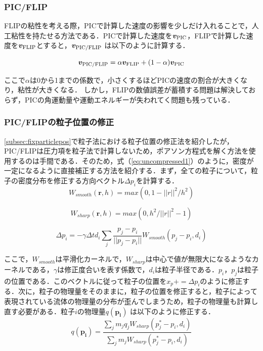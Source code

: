 \documentclass[a4j,12pt]{jreport}
\begin{document}
\subsubsection{PIC/FLIP} \label{subsec:PIC/FLIP}
FLIPの粘性を考える際，PICで計算した速度の影響を少しだけ入れることで，人工粘性を持たせる方法である．PICで計算した速度を$\bm{v}_{\rm{PIC}}$，FLIPで計算した速度を$\bm{v}_{\rm{FLIP}}$とすると，$\bm{v}_{\rm{PIC/FLIP}}$ は以下のように計算する．

\begin{equation}\label{eq:PIC/FLIP}
\bm{v}_{\rm{PIC/FLIP}} =\alpha \bm{v}_{\rm{FLIP}} +(1-\alpha) \bm{v}_{\rm{PIC}}
\end{equation} 

ここで$\alpha$は0から1までの係数で，小さくするほどPICの速度の割合が大きくなり，粘性が大きくなる．
しかし，FLIPの数値誤差が蓄積する問題は解決しておらず，PICの角運動量や運動エネルギーが失われてく問題も残っている．

\subsubsection{PIC/FLIPの粒子位置の修正}\label{subsubsec:fixparticlepos}
\ref{subsec:fixparticlepos}で粒子法における粒子位置の修正法を紹介したが，PIC/FLIPは圧力項を粒子法で計算しないため，ポアソン方程式を解く方法を使用するのは手間である．そのため，式（\ref{eq:uncompressed1}）のように，密度が一定になるように直接補正する方法を紹介する．まず，全ての粒子について，粒子の密度分布を修正する方向ベクトル$\Delta p_i$を計算する．
\begin{equation}\label{eq:w_smooth}
W_{smooth}(\bm{r},h) = max(0,1-||r||^2/h^2)
\end{equation} 

\begin{equation}\label{eq:w_sharp}
W_{sharp}(\bm{r},h) = max(0,h^2/||r||^2 - 1)
\end{equation} 

\begin{equation}\label{eq:fixVector}
\Delta p_i = -\gamma \Delta td_i\sum\limits_j \frac{p_j - p_i}{||p_j - p_i||}W_{smooth}(p_j - p_i,d_i)
\end{equation} 

ここで，$W_{smooth}$は平滑化カーネルで，$W_{sharp}$は中心で値が無限大になるようなカーネルである，$\gamma$は修正度合いを表す係数で，$d_i$は粒子半径である．$p_i$，$p_j$は粒子の位置である．このベクトルに従って粒子の位置を$x_p += \Delta p_i$のように修正する．次に，粒子の物理量をそのままに，粒子の位置を修正すると，粒子によって表現されている流体の物理量の分布が歪んでしまうため，粒子の物理量も計算し直す必要がある．粒子$i$の物理量$q(\bm{p_i})$ は以下のように修正する．
\begin{equation}\label{eq:fixVelocity}
q(\bm{p_i}) = \frac{\sum\limits_j m_jq_jW_{sharp}(p^*_j - p_i,d_i)}{\sum\limits_j m_jW_{sharp}(p^*_j - p_i,d_i)}
\end{equation} 
\end{document}
